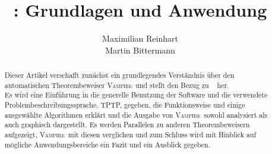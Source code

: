 \documentclass{article}
\author{
	Maximilian Reinhart\\
	Martin Bittermann
}
\title{\vampire: Grundlagen und Anwendung}
\newcommand{\vampire}{\textsc{Vampire}~}
\begin{document}
\maketitle

\begin{abstract}
	Dieser Artikel verschafft zunächst ein grundlegendes Verständnis über den automatischen Theorembeweiser \vampire und
	stellt den Bezug zu ~\cite{cav2013} her. \\
	Es wird eine Einführung in die generelle Benutzung der Software und die verwendete Problembeschreibungssprache, TPTP, gegeben, 
	die Funktionsweise und einige ausgewählte Algorithmen erklärt und
	die Ausgabe von \vampire sowohl analysiert als auch graphisch dargestellt.
	Es werden Parallelen zu anderen Theorembeweisern aufgezeigt, \vampire mit diesen verglichen 
	und zum Schluss wird mit Hinblick auf mögliche Anwendungsbereiche ein Fazit und ein Ausblick gegeben.
\end{abstract}


\end{document}
